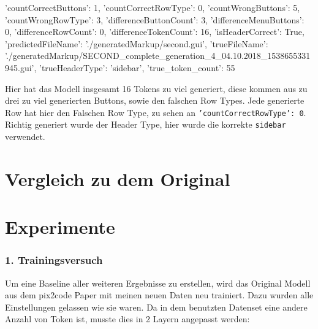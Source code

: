 \documentclass[pdftex,a4paper,halfparskip]{scrartcl}
\begin{document}
\begin{spverbatim}

{
 'countCorrectButtons': 1,
 'countCorrectRowType': 0,
 'countWrongButtons': 5,
 'countWrongRowType': 3,
 'differenceButtonCount': 3,
 'differenceMenuButtons': 0,
 'differenceRowCount': 0,
 'differenceTokenCount': 16,
 'isHeaderCorrect': True,
 'predictedFileName': './generatedMarkup/second.gui',
 'trueFileName': './generatedMarkup/SECOND_complete_generation_4_04.10.2018_1538655331945.gui',
 'trueHeaderType': 'sidebar',
 'true_token_count': 55
}

\end{spverbatim}

Hier hat das Modell insgesamt 16 Tokens zu viel generiert, diese kommen aus zu drei zu viel generierten Buttons, sowie den falschen Row Types. Jede generierte Row hat hier den Falschen Row Type, zu sehen an \texttt{'countCorrectRowType': 0}. Richtig generiert wurde der Header Type, hier wurde die korrekte \texttt{sidebar} verwendet.

\section{Vergleich zu dem Original}
\section{Experimente}

\subsubsection{1. Trainingsversuch}

Um eine Baseline aller weiteren Ergebnisse zu erstellen, wird das Original Modell aus dem pix2code Paper mit meinen neuen Daten neu trainiert. Dazu wurden alle Einstellungen gelassen wie sie waren. Da in dem benutzten Datenset eine andere Anzahl von Token ist, musste dies in 2 Layern angepasst werden:
\end{document}
